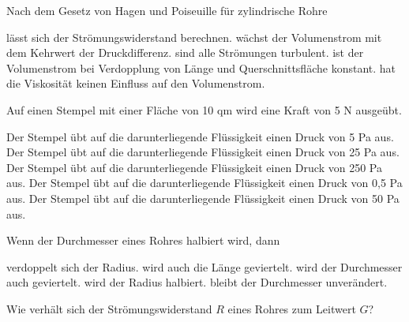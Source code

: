 \documentclass[11pt]{exam}
\begin{document}
\setlength{\voffset}{-0.5in}
\setlength{\headsep}{5pt}

\hspace{2mm}
 \hspace{5mm}
\vspace{4mm}

\begin{questions}

\question Nach dem Gesetz von Hagen und Poiseuille für zylindrische Rohre

\begin{choices}
	\choice lässt sich der Strömungswiderstand berechnen.
	\choice wächst der Volumenstrom mit dem Kehrwert der Druckdifferenz.
	\choice sind alle Strömungen turbulent.
	\choice ist der Volumenstrom bei Verdopplung von Länge und Querschnittsfläche konstant.
	\choice hat die Viskosität keinen Einfluss auf den Volumenstrom.
\end{choices}

\vspace{3mm}\question Auf einen Stempel mit einer Fläche von 10 qm wird eine Kraft von 5 N ausgeübt.

\begin{choices}
	\choice Der Stempel übt auf die darunterliegende Flüssigkeit einen Druck von 5 Pa aus.
	\choice Der Stempel übt auf die darunterliegende Flüssigkeit einen Druck von 25 Pa aus.
	\choice Der Stempel übt auf die darunterliegende Flüssigkeit einen Druck von 250 Pa aus.
	\choice Der Stempel übt auf die darunterliegende Flüssigkeit einen Druck von 0,5 Pa aus.
	\choice Der Stempel übt auf die darunterliegende Flüssigkeit einen Druck von 50 Pa aus.
\end{choices}

\vspace{3mm}\question Wenn der Durchmesser eines Rohres halbiert wird, dann

\begin{choices}
	\choice verdoppelt sich der Radius.
	\choice wird auch die Länge geviertelt.
	\choice wird der Durchmesser auch geviertelt.
	\choice wird der Radius halbiert.
	\choice bleibt der Durchmesser unverändert.
\end{choices}

\vspace{3mm}\question Wie verhält sich der Strömungswiderstand \(R\) eines Rohres zum Leitwert \(G\)?


\end{questions}
\end{document}
